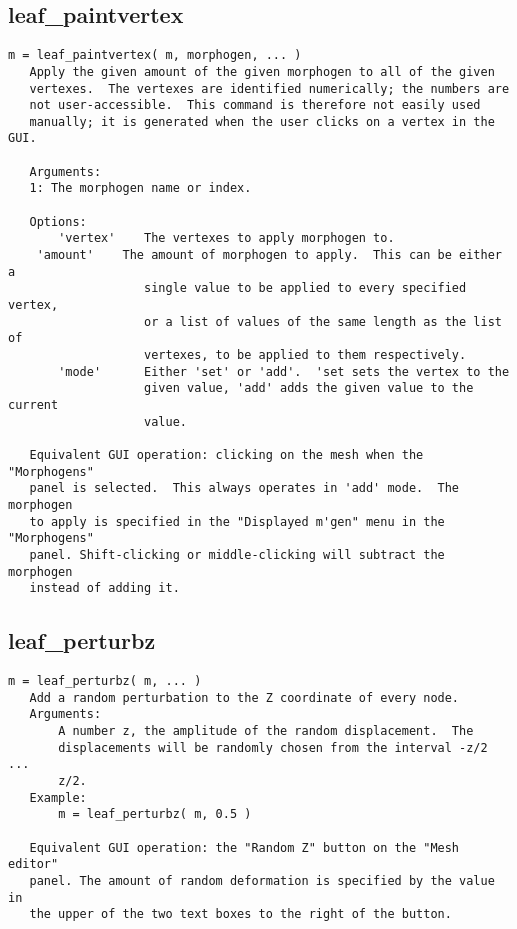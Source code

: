 \subsection{leaf\_paintvertex}\label{section-leaf-paintvertex}

\begin{verbatim}
m = leaf_paintvertex( m, morphogen, ... )
   Apply the given amount of the given morphogen to all of the given
   vertexes.  The vertexes are identified numerically; the numbers are
   not user-accessible.  This command is therefore not easily used
   manually; it is generated when the user clicks on a vertex in the GUI.

   Arguments:
   1: The morphogen name or index.

   Options:
       'vertex'    The vertexes to apply morphogen to.
   	'amount'    The amount of morphogen to apply.  This can be either a
                   single value to be applied to every specified vertex,
                   or a list of values of the same length as the list of
                   vertexes, to be applied to them respectively.
       'mode'      Either 'set' or 'add'.  'set sets the vertex to the
                   given value, 'add' adds the given value to the current
                   value.

   Equivalent GUI operation: clicking on the mesh when the "Morphogens"
   panel is selected.  This always operates in 'add' mode.  The morphogen
   to apply is specified in the "Displayed m'gen" menu in the "Morphogens"
   panel. Shift-clicking or middle-clicking will subtract the morphogen
   instead of adding it.
\end{verbatim}

\subsection{leaf\_perturbz}\label{section-leaf-perturbz}

\begin{verbatim}
m = leaf_perturbz( m, ... )
   Add a random perturbation to the Z coordinate of every node.
   Arguments:
       A number z, the amplitude of the random displacement.  The
       displacements will be randomly chosen from the interval -z/2 ...
       z/2.
   Example:
       m = leaf_perturbz( m, 0.5 )

   Equivalent GUI operation: the "Random Z" button on the "Mesh editor"
   panel. The amount of random deformation is specified by the value in
   the upper of the two text boxes to the right of the button.
\end{verbatim}

